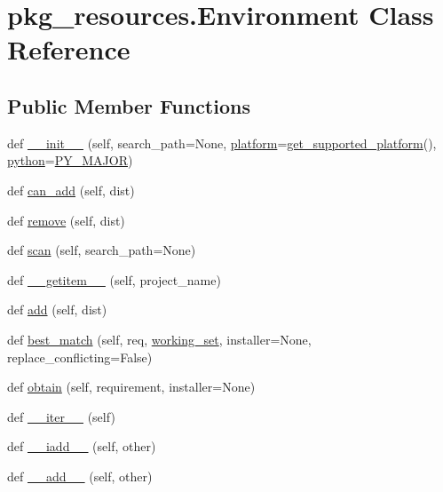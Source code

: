 \hypertarget{classpkg__resources_1_1Environment}{}\section{pkg\+\_\+resources.\+Environment Class Reference}
\label{classpkg__resources_1_1Environment}
\subsection*{Public Member Functions}
\begin{DoxyCompactItemize}
\item 
def \hyperlink{classpkg__resources_1_1Environment_ac17977fcfff1f90f694316f938090eb2}{\+\_\+\+\_\+init\+\_\+\+\_\+} (self, search\+\_\+path=None, \hyperlink{classpkg__resources_1_1Environment_a8512772df91acc77fc4ea47e2d483e7a}{platform}=\hyperlink{namespacepkg__resources_a2ad1c6a7e428d89c722264e41cc9214e}{get\+\_\+supported\+\_\+platform}(), \hyperlink{classpkg__resources_1_1Environment_a92643caa8139bba1bd63c32c22d1878c}{python}=\hyperlink{namespacepkg__resources_a27901fd744697f2b2d55b6f1255cf020}{P\+Y\+\_\+\+M\+A\+J\+OR})
\item 
def \hyperlink{classpkg__resources_1_1Environment_ac68862356ee785bb410b3d2a503952f1}{can\+\_\+add} (self, dist)
\item 
def \hyperlink{classpkg__resources_1_1Environment_aa51b1c4f8c8c146f2fc83a833608a0d1}{remove} (self, dist)
\item 
def \hyperlink{classpkg__resources_1_1Environment_a2dd1caa73a329d4c50b0ab9fdec9c1d4}{scan} (self, search\+\_\+path=None)
\item 
def \hyperlink{classpkg__resources_1_1Environment_af401af1f867613b8f268ab93a1275aff}{\+\_\+\+\_\+getitem\+\_\+\+\_\+} (self, project\+\_\+name)
\item 
def \hyperlink{classpkg__resources_1_1Environment_a0ba8999abdb4cbc7a1965766560197fc}{add} (self, dist)
\item 
def \hyperlink{classpkg__resources_1_1Environment_a7738575eddd2a89e35eff52f3462f20b}{best\+\_\+match} (self, req, \hyperlink{namespacepkg__resources_a5eecf7277dc4e63e653bfa39a805e4d2}{working\+\_\+set}, installer=None, replace\+\_\+conflicting=False)
\item 
def \hyperlink{classpkg__resources_1_1Environment_af631296df13a518bb3cd97f04efa25fd}{obtain} (self, requirement, installer=None)
\item 
def \hyperlink{classpkg__resources_1_1Environment_a7f967904be209cefe39230614470ca3f}{\+\_\+\+\_\+iter\+\_\+\+\_\+} (self)
\item 
def \hyperlink{classpkg__resources_1_1Environment_ac8fc54442fe5e9c647b57320e7ccf78a}{\+\_\+\+\_\+iadd\+\_\+\+\_\+} (self, other)
\item 
def \hyperlink{classpkg__resources_1_1Environment_a8f9750420dd62e8b71b0b2f06f424c57}{\+\_\+\+\_\+add\+\_\+\+\_\+} (self, other)
\end{DoxyCompactItemize}

